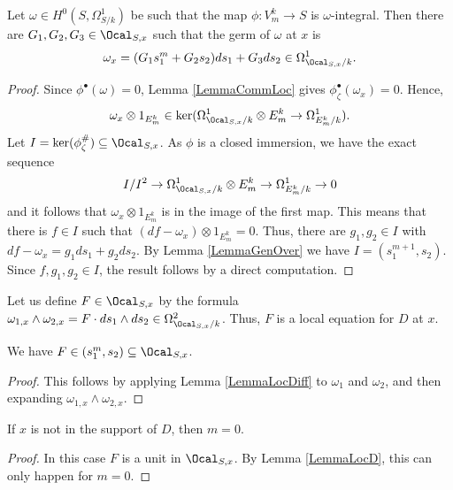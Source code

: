 \begin{lemma}
\notready \label{LemmaLocDiff} Let $\omega\in H^0(S, \Omega^1_{S/k})$ be such that the map $\phi:V_m^k\to S$ is $\omega$-integral. Then there are $G_1,G_2,G_3\in \Ocal_{S,x}$ such that the germ of $\omega$ at $x$ is
$$
\omega_x=(G_1s_1^m + G_2s_2)ds_1 + G_3ds_2 \in \Omega^1_{\Ocal_{S,x}/k}.
$$
\end{lemma}
\begin{proof} Since $\phi^\bullet(\omega)=0$, Lemma \ref{LemmaCommLoc} gives $\phi^\bullet_{\zeta}(\omega_x)=0$. Hence,
$$
\omega_x\otimes 1_{E_m^k}\in \ker (\Omega^1_{\Ocal_{S,x}/k}\otimes E_m^k\to \Omega^1_{E_m^k/k}).
$$
Let $I=\ker(\phi^\#_\zeta)\subseteq \Ocal_{S,x}$. As $\phi$ is a closed immersion, we have the exact sequence
$$
I/I^2\to \Omega^1_{\Ocal_{S,x}/k}\otimes E_m^k\to \Omega^1_{E_m^k/k}\to 0
$$
and it follows that $\omega_x\otimes 1_{E_m^k}$ is in the image of the first map. This means that there is $f\in I$ such that $(df-\omega_x)\otimes 1_{E_m^k}=0$. Thus, there are $g_1,g_2\in I$ with $df-\omega_x=g_1ds_1+g_2ds_2$. By Lemma \ref{LemmaGenOver} we have $I=(s_1^{m+1},s_2)$. Since $f,g_1,g_2\in I$, the result follows by a direct computation.
\end{proof}

Let us define $F\in \Ocal_{S,x}$ by the formula $\omega_{1,x}\wedge\omega_{2,x} = F\cdot ds_1\wedge ds_2\in \Omega^2_{\Ocal_{S,x}/k}$. Thus, $F$ is a local equation for $D$ at $x$.

\begin{lemma}
\notready\label{LemmaLocD} We have $F\in (s_1^m,s_2)\subseteq \Ocal_{S,x}$.
\end{lemma}
\begin{proof} This follows by applying Lemma \ref{LemmaLocDiff} to $\omega_1$ and $\omega_2$, and then expanding $\omega_{1,x}\wedge \omega_{2,x}$.
\end{proof}

\begin{corollary}
\notready \label{Corom0} If $x$ is not in the support of $D$, then $m=0$.
\end{corollary}
\begin{proof} In this case $F$ is a unit in $\Ocal_{S,x}$. By Lemma \ref{LemmaLocD}, this can only happen for $m=0$.
\end{proof}
